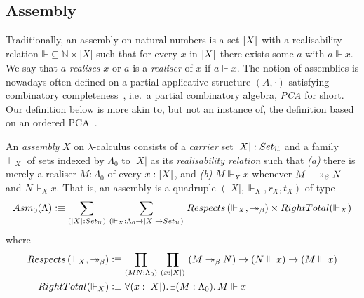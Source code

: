 \documentclass[a4paper,UKenglish,numberwithinsect,cleveref,thm-restate]{lipics-v2021}
\numberwithin{equation}{section}
\theoremstyle{plain}
\begin{document}
\subsection{Assembly}
Traditionally, an assembly on natural numbers is a set $\mathopen{}\left|X\right|_{}^{}\mathclose{}$ with a realisability relation $\mathord{\Vdash} \subseteq \mathbb{N} \times |X|$ such that for every $x$ in $\mathopen{}\left|X\right|_{}^{}\mathclose{}$ there exists some $a$ with $a \Vdash x$.
We say that $a$ \emph{realises} $x$ or $a$ is a \emph{realiser} of $x$ if $a \Vdash x$.
The notion of assemblies is nowadays often defined on a partial applicative structure $(A, \cdot)$ satisfying combinatory completeness~\cite{Oosten2008}, i.e.\ a partial combinatory algebra, \emph{PCA} for short.
Our definition below is more akin to, but not an instance of, the definition based on an ordered PCA~\cite{Hofstra2003}.
\begin{definition}\label{def:assembly}
  An \emph{assembly} $X$ on $\lambda$-calculus consists of a \emph{carrier} set $|X| : \setU$ and a family ${\Vdash_X}$ of sets indexed by $\Lambda_0$ to $|X|$ as its \emph{realisability relation} such that
  \emph{(a)} there is merely a realiser $M : \Lambda_0$ of every $x : \mathopen{}\left|X\right|_{}^{}\mathclose{}$, and
  \emph{(b)} $M \Vdash_X x$ whenever $M \reduce N$ and $N \Vdash_X x$.
  That is, an assembly is a quadruple $(|X|, \Vdash_X, r_X, t_X)$ of type
  \[
    \Asm_0(\Lambda) \defeq \sm{\bproj{X} : {\setU}}{\mathord{\Vdash_X}:\Lambda_0 \to |X| \to \setU} 
      \mathsf{Respects}\left(\Vdash_X, \mathord{\twoheadrightarrow_\beta}\right)
      \times \mathsf{RightTotal}({\Vdash_X})
  \]
  where
  \begin{align}
    \mathsf{Respects}\left(\mathord{\Vdash_X}, \mathord{\twoheadrightarrow_\beta}\right) & \defeq\prd{M N : \Lambda_0}{x : |X|} \left(M \twoheadrightarrow_ \beta N\right) \to \left(N \Vdash x\right) \to \left(M \Vdash x\right) \label{def:respect-reduction} \\      
    \mathsf{RightTotal}(\Vdash_X) & \defeq \fall{x : |X|}\exis{M : \Lambda_0} M \Vdash x
    \label{def:right-total}
  \end{align}
\end{definition}
\end{document}
